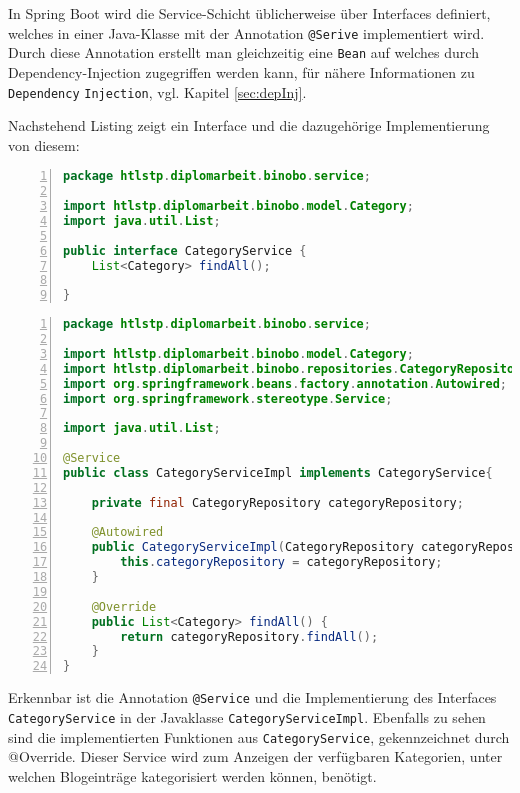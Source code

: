 \documentclass[paper=a4,12pt]{scrreprt}
\begin{document}
In Spring Boot wird die Service-Schicht üblicherweise über Interfaces definiert, welches in einer Java-Klasse mit der Annotation \texttt{@Serive} implementiert wird. Durch diese Annotation erstellt
man gleichzeitig eine \texttt{Bean}\cite{beans} auf welches durch Dependency-Injection\cite{dep_inj} zugegriffen werden kann, für nähere Informationen zu \texttt{Dependency} \texttt{Injection}, vgl. Kapitel \ref{sec:depInj}.\newline

Nachstehend Listing zeigt ein Interface und die dazugehörige Implementierung von diesem:\newline

\begin{lstlisting}[caption={Category-Service Interface}, captionpos=b, label={listing:cat_service}, language=java, numbers=left,
  stepnumber=1]
package htlstp.diplomarbeit.binobo.service;

import htlstp.diplomarbeit.binobo.model.Category;
import java.util.List;

public interface CategoryService {
    List<Category> findAll();

}  
\end{lstlisting}
\begin{lstlisting}[caption={Category-Service Implementierung}, captionpos=b, label={listing:cat_service_impl}, language=java, numbers=left,
  stepnumber=1]
package htlstp.diplomarbeit.binobo.service;

import htlstp.diplomarbeit.binobo.model.Category;
import htlstp.diplomarbeit.binobo.repositories.CategoryRepository;
import org.springframework.beans.factory.annotation.Autowired;
import org.springframework.stereotype.Service;

import java.util.List;

@Service
public class CategoryServiceImpl implements CategoryService{

    private final CategoryRepository categoryRepository;

    @Autowired
    public CategoryServiceImpl(CategoryRepository categoryRepository) {
        this.categoryRepository = categoryRepository;
    }

    @Override
    public List<Category> findAll() {
        return categoryRepository.findAll();
    }
}
\end{lstlisting}

Erkennbar ist die Annotation \texttt{@Service} und die Implementierung des Interfaces \texttt{CategoryService} in der Javaklasse \texttt{CategoryServiceImpl}. Ebenfalls zu sehen sind die
implementierten Funktionen aus \texttt{CategoryService}, gekennzeichnet durch @Override.\newline
Dieser Service wird zum Anzeigen der verfügbaren Kategorien, unter welchen Blogeinträge kategorisiert werden können, benötigt.\newline
\end{document}
